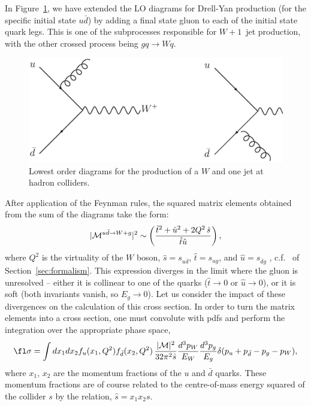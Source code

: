 \documentclass[12pt]{iopart}
\begin{document}
In Figure~\ref{fig:dy_real}, we have extended the LO diagrams for Drell-Yan production
(for the specific initial state $u\bar{d}$) by
adding a final state gluon to each of the initial state quark legs. This is one  of the
subprocesses responsible for $W+1$~jet production, with the other crossed process being $gq \rightarrow Wq$.
%
\begin{figure}[t]
\begin{center}
\includegraphics[width=12cm]{dy_real2.ps}
\end{center}
\caption{Lowest order diagrams for the production of a $W$ and one jet
at hadron colliders.}
\label{fig:dy_real}
\end{figure}
%
After application of the Feynman rules, the squared
matrix elements obtained from the sum of the diagrams take the form:
\begin{equation}
|{\cal M}^{u{\bar d} \to W+g}|^2 \sim \left(
\frac{{\hat t}^2 + {\hat u}^2 + 2 Q^2 \, {\hat s}}{{\hat t}{\hat u}} \right),
\label{eq:wreal}
\end{equation}
where $Q^2$ is the virtuality of the $W$ boson,
${\hat s}=s_{u{\bar d}}$, ${\hat t}=s_{ug}$, and ${\hat u}=s_{{\bar d}g}$
, c.f.~ of Section~\ref{sec:formalism}.
This expression diverges in the limit where the gluon is unresolved --
either it is collinear to one of the quarks (${\hat t} \to 0$ or
${\hat u} \to 0$), or it is soft (both invariants vanish, so $E_g \to 0$).
Let us consider the impact of these divergences on the calculation of this
cross section. In order to turn the matrix elements into a cross section,
one must convolute with pdfs and perform the integration over the appropriate
phase space,
\begin{equation}
\fl
\sigma = \int dx_1 dx_2 f_u(x_1,Q^2) f_{\bar d}(x_2,Q^2) \,
 \frac{|{\cal M}|^2}{32\pi^2{\hat s}}
 \frac{d^3p_W}{E_W} \frac{d^3p_g}{E_g} \delta(p_u+p_{\bar d}-p_g-p_W),
\label{eq:wrealps}
\end{equation}
where $x_1$, $x_2$ are the momentum fractions of the $u$ and ${\bar d}$ quarks.
These momentum fractions are of course related to the centre-of-mass energy squared of
the collider $s$ by the relation, ${\hat s}=x_1 x_2 s$.
\end{document}
